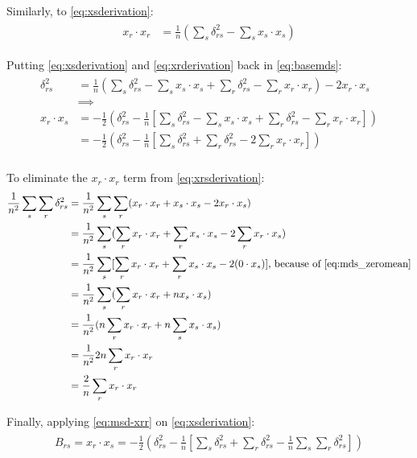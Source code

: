 Similarly, to \ref{eq:xsderivation}:
\begin{align}
\label{eq:xrderivation}
\begin{split}
x_r\cdot x_r &= \frac{1}{n} (\sum_s \delta_{rs}^2 - \sum_s x_s\cdot x_s)
\end{split}
\end{align}

Putting \ref{eq:xsderivation} and \ref{eq:xrderivation} back in \ref{eq:basemds}:
\begin{align}
\label{eq:xrsderivation}
\begin{split}
\delta_{rs}^2 &= \frac{1}{n} (\sum_s \delta_{rs}^2 - \sum_s x_s\cdot x_s + \sum_r \delta_{rs}^2 - \sum_r x_r\cdot x_r) -2x_r\cdot x_s \\
&\implies \\
x_r\cdot x_s &= -\frac{1}{2} (\delta_{rs}^2 - \frac{1}{n} [\sum_s \delta_{rs}^2 - \sum_s x_s\cdot x_s + \sum_r \delta_{rs}^2 - \sum_r x_r\cdot x_r])\\
&= -\frac{1}{2} (\delta_{rs}^2 - \frac{1}{n} [\sum_s \delta_{rs}^2 + \sum_r \delta_{rs}^2 - 2\sum_r x_r\cdot x_r])\\
\end{split}
\end{align}

To eliminate the $x_r\cdot x_r$ term from \ref{eq:xrsderivation}:
\begin{align}
\label{eq:msd-xrr}
\begin{split}
\frac{1}{n^2} \sum_s\sum_r\delta_{rs}^2 &= \frac{1}{n^2} \sum_s\sum_r(x_r\cdot x_r + x_s\cdot x_s -2x_r\cdot x_s) \\
&= \frac{1}{n^2}\sum_s(\sum_r x_r\cdot x_r + \sum_r x_s\cdot x_s -2\sum_r x_r\cdot x_s) \\
&= \frac{1}{n^2}\sum_s [\sum_r x_r\cdot x_r + \sum_r x_s\cdot x_s -2( 0 \cdot x_s)] \textnormal{, because of \ref{eq:mds_zeromean}} \\
&= \frac{1}{n^2}\sum_s(\sum_r x_r\cdot x_r + n x_s\cdot x_s) \\
&= \frac{1}{n^2}(n \sum_r x_r\cdot x_r + n \sum_s x_s \cdot x_s) \\
&= \frac{1}{n^2} 2n \sum_r x_r\cdot x_r \\
&= \frac{2}{n} \sum_r x_r\cdot x_r
\end{split}
\end{align}

Finally, applying \ref{eq:msd-xrr} on \ref{eq:xsderivation}:
\begin{align}
\label{eq:mds-defb}
\begin{split}
B_{rs} = x_r\cdot x_s = -\frac{1}{2} (\delta_{rs}^2 - \frac{1}{n} [\sum_s \delta_{rs}^2 + \sum_r \delta_{rs}^2 - \frac{1}{n}\sum_s \sum_r \delta_{rs}^2])
\end{split}
\end{align}

